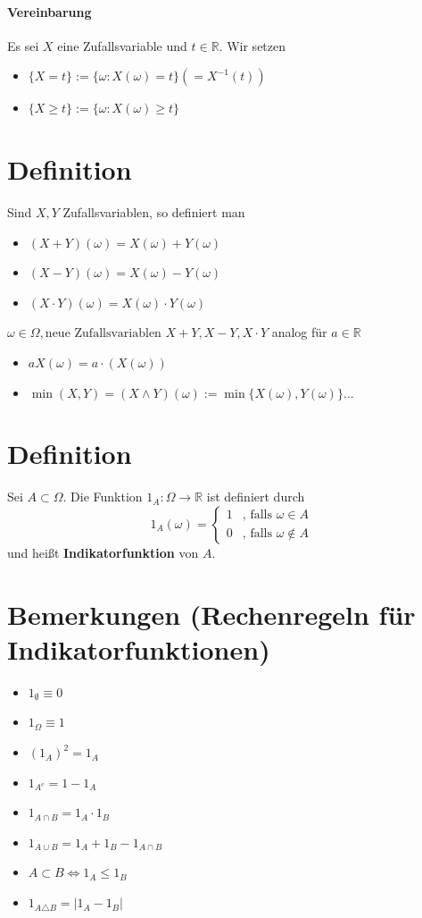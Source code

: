 \documentclass[a4paper,11pt,notitlepage]{report}
\newcommand{\R}{{\ensuremath{\mathbb{R}}}}
\begin{document}
\paragraph{Vereinbarung}
Es sei $X$ eine Zufallsvariable und $t \in \R$. Wir setzen
\begin{itemize}
 \item $\{X=t\} := \{\omega \colon X(\omega) = t \} (= X^{-1}(t))$
 \item $\{X \geq t\} := \{\omega \colon X(\omega) \geq t \}$
\end{itemize}

\section{Definition}
Sind $X,Y$ Zufallsvariablen, so definiert man
\begin{itemize}
	\item $(X+Y)(\omega) = X(\omega) + Y (\omega)$
	\item $(X-Y)(\omega) = X(\omega) - Y (\omega)$
	\item $(X \cdot Y)(\omega) = X(\omega) \cdot Y (\omega)$
\end{itemize}
$\omega \in \Omega, \text{neue Zufallsvariablen } X+Y, X-Y, X \cdot Y$
\newline
analog für $a \in \R$
\begin{itemize}
	\item $a X(\omega) = a \cdot (X(\omega))$
	\item $\min(X,Y) = (X \wedge Y)(\omega):= \min \{X(\omega), Y(\omega)\} \ldots$
\end{itemize}

\section{Definition}
Sei $A \subset \Omega$. Die Funktion $1_A \colon \Omega \rightarrow \R$ ist definiert durch
$$1_A(\omega) = \begin{cases} 1 & \text{, falls } \omega \in A \\
							  0 & \text{, falls } \omega \notin A						
\end{cases}
$$
und heißt \textbf{Indikatorfunktion} von $A$.

\section{Bemerkungen (Rechenregeln für Indikatorfunktionen)}

\begin{itemize}
	\item $1_{\emptyset} \equiv 0$
	\item $1_{\Omega} \equiv 1$
	\item $(1_A)^2 = 1_A$
	\item $1_{A^c} = 1 - 1_A$
	\item $1_{A \cap B} = 1_A \cdot 1_B$
	\item $1_{A \cup B} = 1_A + 1_B - 1_{A \cap B}$
	\item $A \subset B \Leftrightarrow 1_A \leq 1_B$
	\item $1_{A \triangle B} = |1_A - 1_B|$
\end{itemize}
\end{document}
